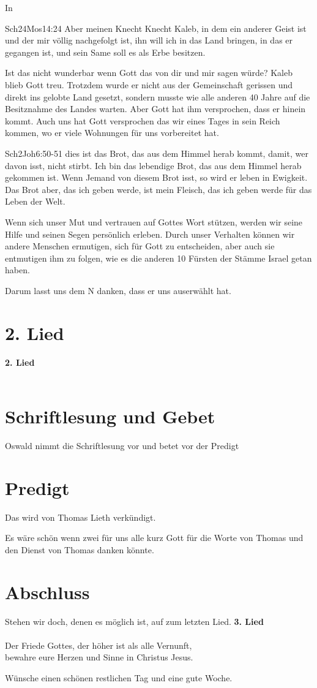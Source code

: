 \documentclass[12pt,a4paper]{scrarticle}
\begin{document}
In 
\begin{bibeltext}{Sch2}{4Mos}{14:24}
Aber meinen Knecht Knecht Kaleb, in dem ein anderer Geist ist und der mir völlig nachgefolgt ist, ihn will ich in das Land bringen, in das er gegangen ist, und sein Same soll es als Erbe besitzen.
\end{bibeltext}
Ist das nicht wunderbar wenn Gott das von dir und mir sagen würde? Kaleb blieb Gott treu. Trotzdem wurde er nicht aus der Gemeinschaft gerissen und direkt ins gelobte Land gesetzt, sondern musste wie alle anderen 40 Jahre auf die Besitznahme des Landes warten. Aber Gott hat ihm versprochen, dass er hinein kommt. 
Auch uns hat Gott versprochen das wir eines Tages in sein Reich kommen, wo er viele Wohnungen für uns vorbereitet hat.
\begin{bibeltext}{Sch2}{Joh}{6:50-51}
dies ist das Brot, das aus dem Himmel herab kommt, damit, wer davon isst, nicht stirbt. Ich bin das lebendige Brot, das aus dem Himmel herab gekommen ist. Wenn Jemand von diesem Brot isst, so wird er leben in Ewigkeit. Das Brot aber, das ich geben werde, ist mein Fleisch, das ich geben werde für das Leben der Welt.
\end{bibeltext}
Wenn sich unser Mut und vertrauen auf Gottes Wort stützen, werden wir seine Hilfe und seinen Segen persönlich erleben. Durch unser Verhalten können wir andere Menschen ermutigen, sich für Gott zu entscheiden, aber auch sie entmutigen ihm zu folgen, wie es die anderen 10 Fürsten der Stämme Israel getan haben.

Darum lasst uns dem \herr N danken, dass er uns auserwählt hat.

\section{2. Lied}

\textbf{2. Lied}
\\
\\
\section{Schriftlesung und Gebet}
Oswald nimmt die Schriftlesung vor und betet vor der Predigt

\section{Predigt}
Das wird von Thomas Lieth verkündigt.

Es wäre schön wenn zwei für uns alle kurz Gott für die Worte von Thomas und den Dienst von Thomas danken könnte.

\section{Abschluss}
Stehen wir doch, denen es möglich ist, auf zum letzten Lied.
\textbf{3. Lied}\\
\\
Der Friede Gottes, der höher ist als alle Vernunft,\\
bewahre eure Herzen und Sinne in Christus Jesus.

Wünsche einen schönen restlichen Tag und eine gute Woche.
\end{document}
